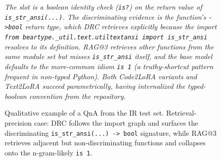 \documentclass[11pt]{article}
\newcommand{\codelora}{Code2LoRA\xspace}
\newcommand{\textlora}{Text2LoRA\xspace}
\begin{document}
\begin{figure}[!htbp]
\begin{center}
\begin{tcolorbox}
\vspace{1pt}
{\footnotesize\itshape\color{black!55}
The slot is a boolean identity check (\texttt{is\;?}) on the return value of \texttt{is\_str\_ansi(...)}. The discriminating evidence is the function's \texttt{->\;bool} return type, which DRC retrieves explicitly because the import \texttt{from beartype.\_util.text.utiltextansi import is\_str\_ansi} resolves to its definition. RAG@3 retrieves other functions from the same module set but \emph{misses} \texttt{is\_str\_ansi} itself, and the base model defaults to the more-common idiom \texttt{is 1} (a truthy-shortcut pattern frequent in non-typed Python). Both \codelora{} variants and \textlora{} succeed parametrically, having internalized the typed-boolean convention from the repository.
}

\end{tcolorbox}
\caption{Qualitative example of a QnA from the IR test set. Retrieval-precision case: DRC follows the import graph and surfaces the discriminating \texttt{is\_str\_ansi(...) -> bool} signature, while RAG@3 retrieves adjacent but non-discriminating functions and collapses onto the n-gram-likely \texttt{is 1}.}
\label{fig:qualitative_ir_beartype_195}
\end{center}
\end{figure}
\end{document}
